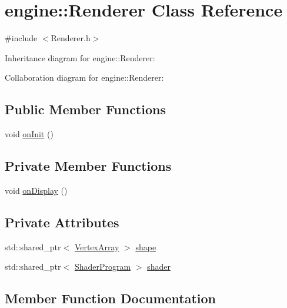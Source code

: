 \hypertarget{classengine_1_1_renderer}{}\section{engine\+:\+:Renderer Class Reference}
\label{classengine_1_1_renderer}


{\ttfamily \#include $<$Renderer.\+h$>$}



Inheritance diagram for engine\+:\+:Renderer\+:


Collaboration diagram for engine\+:\+:Renderer\+:
\subsection*{Public Member Functions}
\begin{DoxyCompactItemize}
\item 
void \mbox{\hyperlink{classengine_1_1_renderer_a566c0e1bc3835f37bf18922d13901524}{on\+Init}} ()
\end{DoxyCompactItemize}
\subsection*{Private Member Functions}
\begin{DoxyCompactItemize}
\item 
void \mbox{\hyperlink{classengine_1_1_renderer_a13048cedb5c2f7d9f28dbb43b69ddea8}{on\+Display}} ()
\end{DoxyCompactItemize}
\subsection*{Private Attributes}
\begin{DoxyCompactItemize}
\item 
std\+::shared\+\_\+ptr$<$ \mbox{\hyperlink{classengine_1_1_vertex_array}{Vertex\+Array}} $>$ \mbox{\hyperlink{classengine_1_1_renderer_ac4b6017a421699831e274ae0f7c5b126}{shape}}
\item 
std\+::shared\+\_\+ptr$<$ \mbox{\hyperlink{classengine_1_1_shader_program}{Shader\+Program}} $>$ \mbox{\hyperlink{classengine_1_1_renderer_ab0737d025d38abcb48022d811439aec9}{shader}}
\end{DoxyCompactItemize}


\subsection{Member Function Documentation}
\mbox{\label{classengine_1_1_renderer_a13048cedb5c2f7d9f28dbb43b69ddea8}} 
